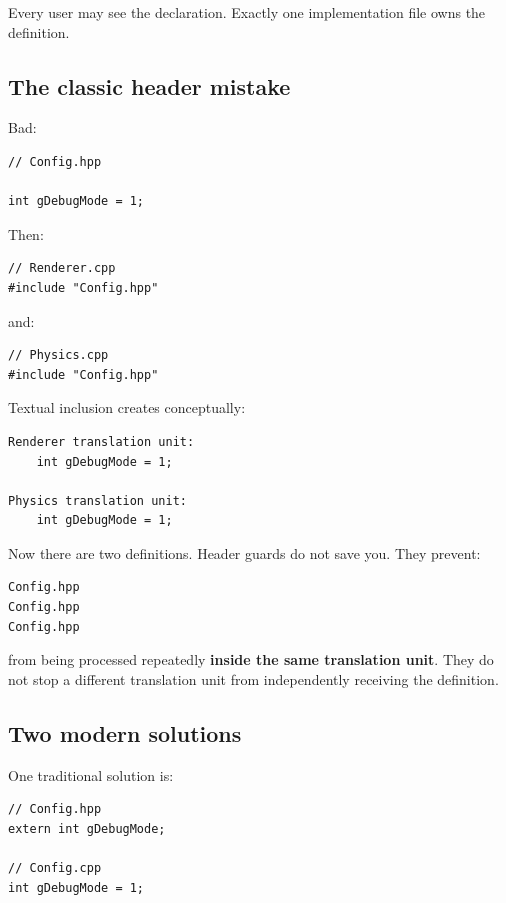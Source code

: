 Every user may see the declaration. Exactly one implementation file owns the definition.

\subsection{The classic header mistake}\label{05-engine-i-ch002-the-classic-header-mistake}

Bad:

\begin{verbatim}
// Config.hpp

int gDebugMode = 1;
\end{verbatim}

Then:

\begin{verbatim}
// Renderer.cpp
#include "Config.hpp"
\end{verbatim}

and:

\begin{verbatim}
// Physics.cpp
#include "Config.hpp"
\end{verbatim}

Textual inclusion creates conceptually:

\begin{verbatim}
Renderer translation unit:
    int gDebugMode = 1;

Physics translation unit:
    int gDebugMode = 1;
\end{verbatim}

Now there are two definitions. Header guards do not save you. They prevent:

\begin{verbatim}
Config.hpp
Config.hpp
Config.hpp
\end{verbatim}

from being processed repeatedly \textbf{inside the same translation unit}. They do not stop a different translation unit from independently receiving the definition.

\subsection{Two modern solutions}\label{05-engine-i-ch002-two-modern-solutions}

One traditional solution is:

\begin{verbatim}
// Config.hpp
extern int gDebugMode;

// Config.cpp
int gDebugMode = 1;
\end{verbatim}

